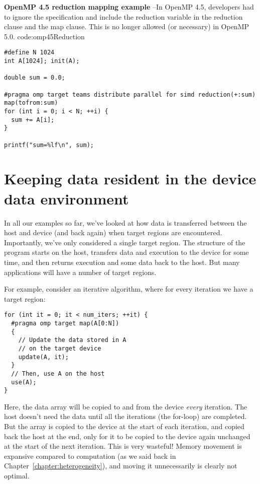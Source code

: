 \begin{CodeExample}%
{\textbf{OpenMP 4.5 reduction mapping example} --\small In OpenMP 4.5, developers had to ignore the specification and include
the reduction variable in the reduction clause and the map clause. This is no longer allowed (or necessary) in OpenMP 5.0.
}%
{code:omp45Reduction}
\begin{lstlisting}
#define N 1024
int A[1024]; init(A);

double sum = 0.0;

#pragma omp target teams distribute parallel for simd reduction(+:sum) map(tofrom:sum)
for (int i = 0; i < N; ++i) {
  sum += A[i];
}

printf("sum=%lf\n", sum);
\end{lstlisting}
\end{CodeExample}


\section{Keeping data resident in the device data environment}
In all our examples so far, we've looked at how data is transferred between the host and device (and back again) when target regions are encountered.
Importantly, we've only considered a single target region.
The structure of the program starts on the host, transfers data and execution to the device for some time, and then returns execution and some data back to the host.
But many applications will have a number of target regions.

For example, consider an iterative algorithm, where for every iteration we have a target region:
\begin{Verbatim}
for (int it = 0; it < num_iters; ++it) {
  #pragma omp target map(A[0:N])
  {
    // Update the data stored in A
    // on the target device
    update(A, it);
  }
  // Then, use A on the host
  use(A);
}
\end{Verbatim}
Here, the data array  will be copied to and from the device \emph{every} iteration.
The host doesn't need the data until all the iterations (the  for-loop) are completed.
But the array is copied to the device at the start of each iteration, and copied back the host at the end, only for it to be copied to the device again unchanged at the start of the next iteration.
This is very wasteful! Memory movement is expansive compared to computation (as we said back in Chapter~\ref{chapter:heterogeneity}), and moving it unnecessarily is clearly not optimal.

